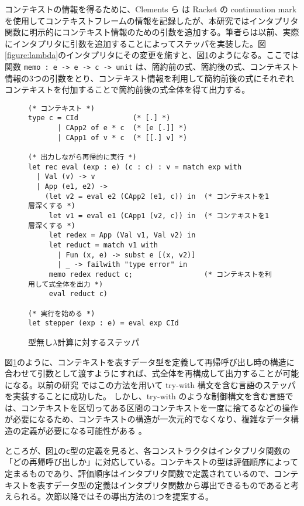 コンテキストの情報を得るために、Clements ら\cite{clements01} は Racket の continuation mark を使用してコンテキストフレームの情報を記録したが、本研究ではインタプリタ関数に明示的にコンテキスト情報のための引数を追加する。筆者らは以前\cite{FCA19}、実際にインタプリタに引数を追加することによってステッパを実装した。図\ref{figure:lambda}のインタプリタにその変更を施すと、図\ref{figure:lambda_stepper}のようになる。ここでは関数 \texttt{memo :\ e -> e -> c -> unit} は、簡約前の式、簡約後の式、コンテキスト情報の3つの引数をとり、コンテキスト情報を利用して簡約前後の式にそれぞれコンテキストを付加することで簡約前後の式全体を得て出力する。

\begin{figure}
\begin{verbatim}
(* コンテキスト *)
type c = CId             (* [.] *)
       | CApp2 of e * c  (* [e [.]] *)
       | CApp1 of v * c  (* [[.] v] *)

(* 出力しながら再帰的に実行 *)
let rec eval (exp : e) (c : c) : v = match exp with
  | Val (v) -> v
  | App (e1, e2) ->
    (let v2 = eval e2 (CApp2 (e1, c)) in  (* コンテキストを1層深くする *)
     let v1 = eval e1 (CApp1 (v2, c)) in  (* コンテキストを1層深くする *)
     let redex = App (Val v1, Val v2) in
     let reduct = match v1 with
       | Fun (x, e) -> subst e [(x, v2)]
       | _ -> failwith "type error" in
     memo redex reduct c;                 (* コンテキストを利用して式全体を出力 *)
     eval reduct c)

(* 実行を始める *)
let stepper (exp : e) = eval exp CId
\end{verbatim}
\caption{型無し$\lambda$計算に対するステッパ}
\label{figure:lambda_stepper}
\end{figure}

図\ref{figure:lambda_stepper}のように、コンテキストを表すデータ型を定義して再帰呼び出し時の構造に合わせて引数として渡すようにすれば、式全体を再構成して出力することが可能になる。以前の研究 \cite{FCA19} ではこの方法を用いて try-with 構文を含む言語のステッパを実装することに成功した。
しかし、try-with のような制御構文を含む言語では、コンテキストを区切ってある区間のコンテキストを一度に捨てるなどの操作が必要になるため、コンテキストの構造が一次元的でなくなり、複雑なデータ構造の定義が必要になる可能性がある \cite{FCA19} 。

ところが、図\ref{figure:lambda_stepper}の\texttt{c}型の定義を見ると、各コンストラクタはインタプリタ関数の「どの再帰呼び出しか」に対応している。コンテキストの型は評価順序によって定まるものであり、評価順序はインタプリタ関数で定義されているので、コンテキストを表すデータ型の定義はインタプリタ関数から導出できるものであると考えられる。次節以降ではその導出方法の1つを提案する。
